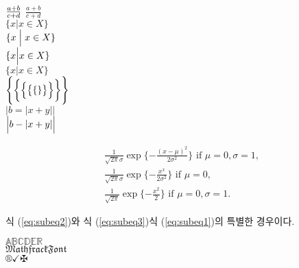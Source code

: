 \documentclass[11pt]{article}
\begin{document}
${a+b \over c+d}$ $\frac{a+b}{c+d}$ \\

$\{ x\Big | x\in X\}$ \\

$\{x\Bigm | x\in X\}$ \\

$\{x \Bigl | x\in X\}$ \\

$\{x \Bigr | x\in X\}$ \\

$\Biggl \{ \biggl \{ \Bigl \{ \bigl \{ \{ \} \bigr \} \Bigr \} \biggr \} \Biggr \}$ \\

$|b=|x+y||$ \\

$\Bigl | b-|x+y| \Bigr |$


\begin{subequations}
\begin{align}
& \frac{1}{\sqrt{2\pi}\sigma}\exp\{-\frac{(x-\mu)^2}{2\sigma^2}\}\mbox{ if } \mu=0, \sigma=1, \label{eq:subeq1} \\
& \frac{1}{\sqrt{2\pi}\sigma}\exp\{-\frac{x^x}{2\sigma^2}\}\mbox{ if } \mu=0, \label{eq:subeq2} \\
& \frac{1}{\sqrt{2\pi}} \exp\{-\frac{x^2}{2}\} \mbox{ if } \mu=0, \sigma=1. \label{eq:subeq3}
\end{align}
\end{subequations}

식 (\ref{eq:subeq2})와 식 (\ref{eq:subeq3})\는 식 (\ref{eq:subeq1})의 특별한 경우이다.

$\mathbb{A B C D E R}$ \\

$\mathfrak{Mathfrack Font}$ \\

$\circledR \checkmark \maltese$ \\
\end{document}
